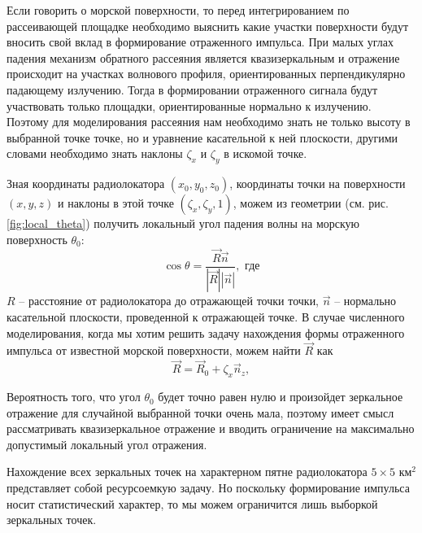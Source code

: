 Если говорить о морской поверхности, то перед интегрированием по рассеивающей
площадке необходимо выяснить какие участки поверхности будут вносить свой вклад
в формирование отраженного импульса.  При малых углах падения механизм обратного  рассеяния является квазизеркальным и отражение происходит на участках волнового профиля, ориентированных
перпендикулярно падающему излучению. Тогда в формировании отраженного сигнала
будут участвовать только площадки, ориентированные нормально к излучению. 
Поэтому для моделирования рассеяния нам необходимо знать не только высоту
в выбранной точке точке, но и уравнение касательной к ней плоскости, другими словами необходимо знать наклоны $\zeta_x$ и  $\zeta_y$ в искомой точке.


Зная координаты радиолокатора  $(x_0,y_0,z_0)$, координаты точки на
поверхности $(x,y,z)$ и наклоны в этой точке $(\zeta_x,\zeta_y,1)$, можем из
геометрии (см. рис. \ref{fig:local_theta}) получить локальный угол падения
волны на морскую поверхность $\theta_0$:
\begin{equation}
    \label{eq:local_theta}
    \cos \theta =  \frac{\vec R \vec n}{|\vec R| |\vec n|}, \text{ где}
\end{equation}
$R$ -- расстояние от радиолокатора до отражающей точки точки,
 $\vec n$ -- нормально касательной плоскости, проведенной к отражающей точке.
 В случае численного моделирования, когда мы хотим решить задачу нахождения
 формы отраженного импульса от известной морской поверхности, можем найти
 $\vec R$ как
 \begin{equation}
     \label{eq:R_1}
     \vec R = \vec R_0 + \zeta_x \vec n_z,
 \end{equation}




Вероятность того, что угол $\theta_0$ будет точно равен нулю и произойдет
зеркальное отражение для случайной выбранной точки очень мала, поэтому имеет
смысл рассматривать квазизеркальное отражение и вводить ограничение на
максимально допустимый локальный угол отражения. 

Нахождение всех зеркальных точек на характерном пятне радиолокатора  $5\times
5 \text{ км}^2$ представляет собой ресурсоемкую задачу. Но поскольку формирование
импульса носит статистический характер, то мы можем ограничится лишь выборкой зеркальных точек. 





